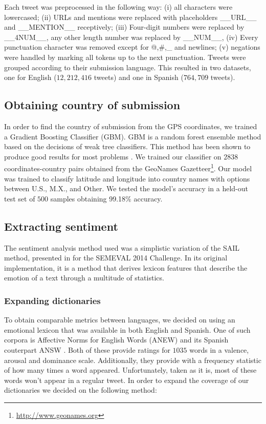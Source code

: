 \documentclass[11pt]{article}
\begin{document}
Each tweet was preprocessed in the following way: (i) all characters were lowercased; (ii) URLs and mentions were replaced with placeholders \_\_URL\_\_ and \_\_MENTION\_\_ receptively; (iii) Four-digit numbers were replaced by \_\_4NUM\_\_, any other length number was replaced by \_\_NUM\_\_, (iv) Every punctuation character  was removed except for @,\#,\_ and newlines; (v) negations were handled by marking all tokens up to the next punctuation. Tweets were grouped according to their submission language. This resulted in two datasets, one for English ($12,212,416$ tweets) and one in Spanish ($764,709$ tweets). 

\subsection{Obtaining country of submission}
In order to find the country of submission from the GPS coordinates, we trained a Gradient Boosting Classifier (GBM). GBM is a random forest ensemble method based on the decisions of weak tree classifiers. This method has been shown to produce good results for most problems \cite{JMLR:v15:delgado14a}. We trained our classifier on $2838$ coordinates-country pairs obtained from the GeoNames Gazetteer\footnote{\url{http://www.geonames.org}}. Our model was trained to classify latitude and longitude into country names with options between U.S., M.X., and Other. We tested the model's accuracy in a held-out test set of $500$ samples obtaining 99.18\% accuracy.

\subsection{Extracting sentiment}
The sentiment analysis method used was a simplistic variation of the SAIL method, presented in \cite{malandrakis_sail_2014} for the SEMEVAL 2014 Challenge. In its original implementation, it is a method that derives lexicon features that describe the emotion of a text through a multitude of statistics. 

\subsubsection{Expanding dictionaries}
To obtain comparable metrics between languages, we decided on using an emotional lexicon that was available in both English and Spanish. One of such corpora is Affective Norms for English Words (ANEW) \cite{bradley1999affective} and its Spanish couterpart ANSW \cite{redondo2007spanish}. Both of these provide ratings for $1035$ words in a valence, arousal and dominance scale. Additionally, they provide with a frequency statistic of how many times a word appeared. Unfortunately, taken as it is, most of these words won't appear in a regular tweet. In order to expand the coverage of our dictionaries we decided on the following method:
\end{document}
